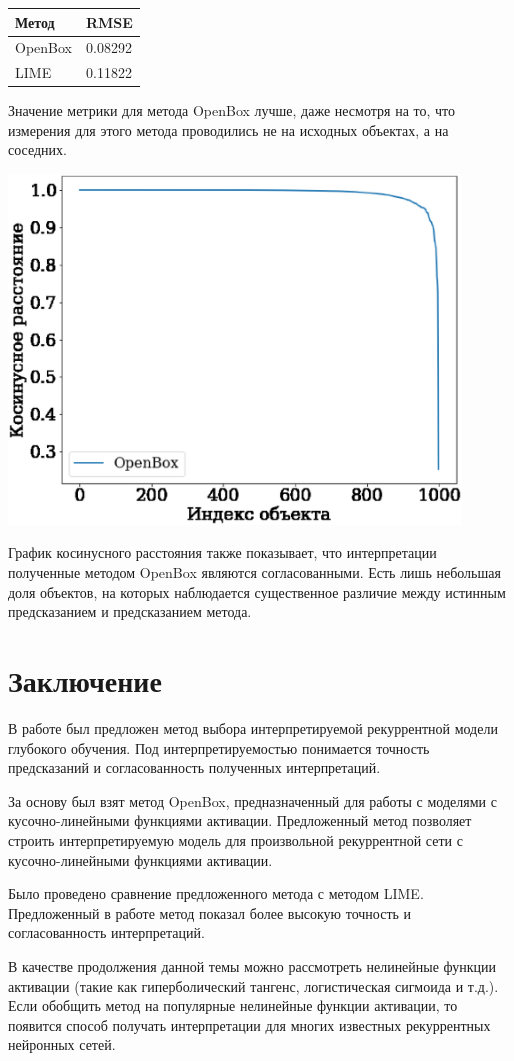\documentclass[a4paper, 12pt]{article}
\begin{document}
\begin{tabular}{l|l}
Метод   &   RMSE  \\ \hline
OpenBox & 0.08292 \\ \hline
LIME    & 0.11822 \\ \hline
\end{tabular}

Значение метрики для метода OpenBox лучше, даже несмотря на то, что измерения для этого метода проводились не на исходных объектах, а на соседних.

\includegraphics[width=0.9\textwidth]{../figures/openbox_cosine.eps}

График косинусного расстояния также показывает, что интерпретации полученные методом OpenBox являются согласованными. Есть лишь небольшая доля объектов, на которых наблюдается существенное различие между истинным предсказанием и предсказанием метода.

\section{Заключение}

В работе был предложен метод выбора интерпретируемой рекуррентной модели глубокого обучения. Под интерпретируемостью понимается точность предсказаний и согласованность полученных интерпретаций.

За основу был взят метод OpenBox, предназначенный для работы с моделями с кусочно-линейными функциями активации. Предложенный метод позволяет строить интерпретируемую модель для произвольной рекуррентной сети с кусочно-линейными функциями активации.

Было проведено сравнение предложенного метода с методом LIME. Предложенный в работе метод показал более высокую точность и согласованность интерпретаций.

В качестве продолжения данной темы можно рассмотреть нелинейные функции активации (такие как гиперболический тангенс, логистическая сигмоида и т.д.). Если обобщить метод на популярные нелинейные функции активации, то появится способ получать интерпретации для многих известных рекуррентных нейронных сетей.



\end{document}
